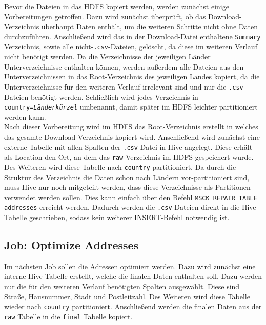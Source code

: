 \documentclass[
	a4paper,
	12p,
	bibliography=totocnumbered
]{scrartcl}
\begin{document}
Bevor die Dateien in das HDFS kopiert werden, werden zunächst einige Vorbereitungen getroffen. Dazu wird zunächst überprüft, ob das Download-Verzeichnis überhaupt Daten enthält, um die weiteren Schritte nicht ohne Daten durchzuführen. Anschließend wird das in der Download-Datei enthaltene \texttt{Summary} Verzeichnis, sowie alle \glqq nicht-\texttt{.csv}-Dateien\grqq{}, gelöscht, da diese im weiteren Verlauf nicht benötigt werden. Da die Verzeichnisse der jeweiligen Länder Unterverzeichnisse enthalten können, werden außerdem alle Dateien aus den Unterverzeichnissen in das Root-Verzeichnis des jeweiligen Landes kopiert, da die Unterverzeichnisse für den weiteren Verlauf irrelevant sind und nur die \texttt{.csv}-Dateien benötigt werden. Schließlich wird jedes Verzeichnis in \texttt{country=\textit{Länderkürzel}} umbenannt, damit später im HDFS leichter partitioniert werden kann.\\

Nach dieser Vorbereitung wird im HDFS das Root-Verzeichnis erstellt in welches das gesamte Download-Verzeichnis kopiert wird. Anschließend wird zunächst eine externe Tabelle mit allen Spalten der \texttt{.csv} Datei  in Hive angelegt. Diese erhält als Location den Ort, an dem das \texttt{raw}-Verzeichnis im HDFS gespeichert wurde. Des Weiteren wird diese Tabelle nach \texttt{country} partitioniert. Da durch die Struktur des Verzeichnis die Daten schon nach Ländern vor-partitioniert sind, muss Hive nur noch mitgeteilt werden, dass diese Verzeichnisse als Partitionen verwendet werden sollen. Dies kann einfach über den Befehl \texttt{MSCK REPAIR TABLE addresses} erreicht werden. Dadurch werden die \texttt{.csv} Dateien direkt in die Hive Tabelle geschrieben, sodass kein weiterer INSERT-Befehl notwendig ist.


\subsection{Job: Optimize Addresses}

Im nächsten Job sollen die Adressen optimiert werden. Dazu wird zunächst eine interne Hive Tabelle erstellt, welche die finalen Daten enthalten soll. Dazu werden nur die für den weiteren Verlauf benötigten Spalten ausgewählt. Diese sind Straße, Hausnummer, Stadt und Postleitzahl. Des Weiteren wird diese Tabelle wieder nach \texttt{country} partitioniert. Anschließend werden die finalen Daten aus der \texttt{raw} Tabelle in die \texttt{final} Tabelle kopiert. \\
\end{document}
